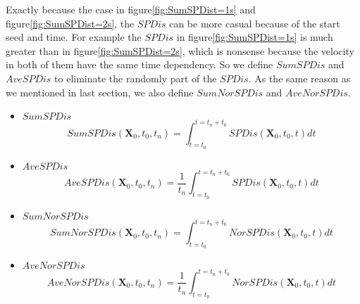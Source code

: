 \documentclass[
     11pt,         %
     a4paper,      %
     oneside,
     ]{article}
\newcommand{\vect}[1]{\boldsymbol{#1}}
\begin{document}
	Exactly because the case in figure\ref{fig:SumSPDist=1s} and figure\ref{fig:SumSPDist=2s}, the $SPDis$ can be more casual because of the start seed and time. For example the $SPDis$ in figure\ref{fig:SumSPDist=1s} is much greater than in figure\ref{fig:SumSPDist=2s}, which is nonsense because the velocity in both of them have the same time dependency. So we define $SumSPDis$ and $AveSPDis$ to eliminate the randomly part of the $SPDis$. As the same reason as we mentioned in last section, we also define $SumNorSPDis$ and $AveNorSPDis$.\\
	\begin{itemize}
		\item $SumSPDis$
		$$SumSPDis(\vect{X}_{0},t_{0},t_{n})=\int_{t=t_{0}}^{t=t_{n}+t_{0}} SPDis(\vect{X}_{0},t_{0},t)dt$$
		\item $AveSPDis$
			$$AveSPDis(\vect{X}_{0},t_{0},t_{n})=\frac{1}{t_{n}}\int_{t=t_{0}}^{t=t_{n}+t_{0}} SPDis(\vect{X}_{0},t_{0},t)dt$$
		\item $SumNorSPDis$
		$$SumNorSPDis(\vect{X}_{0},t_{0},t_{n})=\int_{t=t_{0}}^{t=t_{n}+t_{0}} NorSPDis(\vect{X}_{0},t_{0},t)dt$$
		\item $AveNorSPDis$
				$$AveNorSPDis(\vect{X}_{0},t_{0},t_{n})=\frac{1}{t_{n}}\int_{t=t_{0}}^{t=t_{n}+t_{0}} NorSPDis(\vect{X}_{0},t_{0},t)dt$$
	\end{itemize}
	
\end{document}
